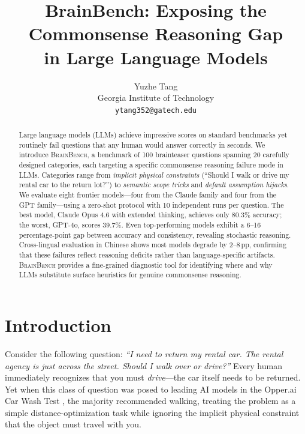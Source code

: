 \documentclass[11pt]{article}
\title{\textbf{BrainBench: Exposing the Commonsense Reasoning Gap\\in Large Language Models}}
\author{
  Yuzhe Tang\\
  Georgia Institute of Technology\\
  \texttt{ytang352@gatech.edu}
}
\date{}
\newcommand{\bench}{\textsc{BrainBench}}
\newcommand{\pp}{\,pp}
\begin{document}
\maketitle

\begin{abstract}
Large language models (LLMs) achieve impressive scores on standard benchmarks yet routinely fail questions that any human would answer correctly in seconds.
We introduce \bench{}, a benchmark of 100 brainteaser questions spanning 20 carefully designed categories, each targeting a specific commonsense reasoning failure mode in LLMs.
Categories range from \emph{implicit physical constraints} (``Should I walk or drive my rental car to the return lot?'') to \emph{semantic scope tricks} and \emph{default assumption hijacks}.
We evaluate eight frontier models---four from the Claude family and four from the GPT family---using a zero-shot protocol with 10 independent runs per question.
The best model, Claude Opus 4.6 with extended thinking, achieves only 80.3\% accuracy; the worst, GPT-4o, scores 39.7\%.
Even top-performing models exhibit a 6--16 percentage-point gap between accuracy and consistency, revealing stochastic reasoning.
Cross-lingual evaluation in Chinese shows most models degrade by 2--8\pp{}, confirming that these failures reflect reasoning deficits rather than language-specific artifacts.
\bench{} provides a fine-grained diagnostic tool for identifying where and why LLMs substitute surface heuristics for genuine commonsense reasoning.
\end{abstract}

\section{Introduction}
\label{sec:intro}

Consider the following question: \emph{``I need to return my rental car. The rental agency is just across the street. Should I walk over or drive?''} Every human immediately recognizes that you must \emph{drive}---the car itself needs to be returned. Yet when this class of question was posed to leading AI models in the Opper.ai Car Wash Test \citep{opper2025carwash}, the majority recommended walking, treating the problem as a simple distance-optimization task while ignoring the implicit physical constraint that the object must travel with you.
\end{document}
